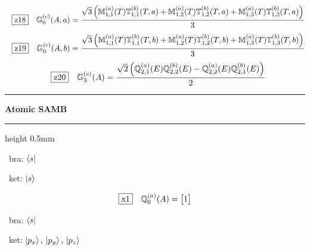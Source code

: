 \documentclass[fleqn,10pt,landscape]{jsarticle}
\begin{document}
\begin{dmath*}
\hspace*{3mm}\fbox{z18}\quad \mathbb{G}_{0}^{(c)}(A,a)=\frac{\sqrt{3} \left(\mathbb{M}_{1,1}^{(a)}(T) \mathbb{T}_{1,1}^{(b)}(T,a) + \mathbb{M}_{1,2}^{(a)}(T) \mathbb{T}_{1,2}^{(b)}(T,a) + \mathbb{M}_{1,3}^{(a)}(T) \mathbb{T}_{1,3}^{(b)}(T,a)\right)}{3}
\end{dmath*}
\begin{dmath*}
\hspace*{3mm}\fbox{z19}\quad \mathbb{G}_{0}^{(c)}(A,b)=\frac{\sqrt{3} \left(\mathbb{M}_{1,1}^{(a)}(T) \mathbb{T}_{1,1}^{(b)}(T,b) + \mathbb{M}_{1,2}^{(a)}(T) \mathbb{T}_{1,2}^{(b)}(T,b) + \mathbb{M}_{1,3}^{(a)}(T) \mathbb{T}_{1,3}^{(b)}(T,b)\right)}{3}
\end{dmath*}
\begin{dmath*}
\hspace*{3mm}\fbox{z20}\quad \mathbb{G}_{3}^{(c)}(A)=\frac{\sqrt{2} \left(\mathbb{Q}_{2,1}^{(a)}(E) \mathbb{Q}_{2,2}^{(b)}(E) - \mathbb{Q}_{2,2}^{(a)}(E) \mathbb{Q}_{2,1}^{(b)}(E)\right)}{2}
\end{dmath*}
\vspace{5mm}

\vspace{5mm}
\noindent \rule[0.5mm]{5mm}{0.5mm}\hspace{3mm}\textbf{Atomic SAMB}\hspace{3mm}\leaders\hrule height 0.5mm\hfill\kern0pt
\vspace{3mm}

\vspace{5mm}

\noindent\textbullet\, bra: $\bra{s}$

\noindent\textbullet\, ket: $\ket{s}$

\begin{dmath*}
\fbox{x1}\quad \mathbb{Q}_{0}^{(a)}(A)=\begin{bmatrix} 1 \end{bmatrix}
\end{dmath*}
\vspace{5mm}

\noindent\textbullet\, bra: $\bra{s}$

\noindent\textbullet\, ket: $\ket{p_{x}},\, \ket{p_{y}},\, \ket{p_{z}}$
\end{document}
